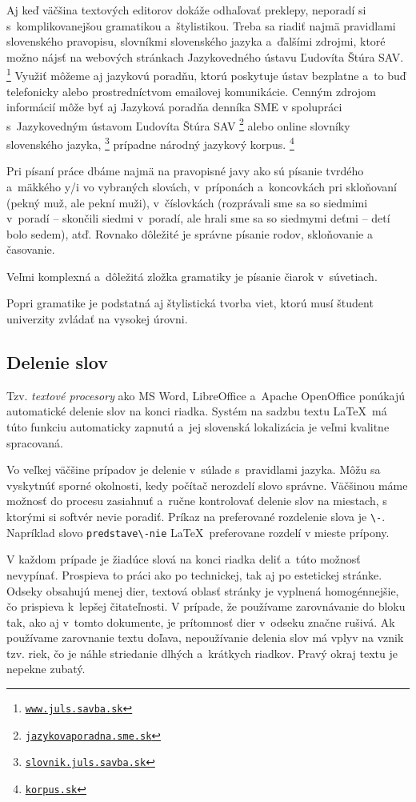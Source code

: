 Aj keď väčšina textových editorov dokáže odhaľovať preklepy,
neporadí si s~komplikovanejšou gramatikou a~štylistikou.
Treba sa riadiť najmä pravidlami slovenského pravopisu,
slovníkmi slovenského jazyka a~ďalšími zdrojmi,
ktoré možno nájsť na webových stránkach
Jazykovedného ústavu Ľudovíta Štúra SAV.%
\footnote{\href{https://www.juls.savba.sk/}{\tt www.juls.savba.sk}}
Využiť môžeme aj jazykovú poradňu,
ktorú poskytuje ústav bezplatne a~to buď telefonicky alebo
prostredníctvom emailovej komunikácie.
Cenným zdrojom informácií môže byť aj Jazyková poradňa
denníka SME v spolupráci
s~Jazykovedným ústavom Ľudovíta Štúra SAV%
\footnote{\href{https://jazykovaporadna.sme.sk/}{\tt jazykovaporadna.sme.sk}}
alebo online slovníky slovenského jazyka,%
\footnote{\href{https://slovnik.juls.savba.sk/}{\tt slovnik.juls.savba.sk}}
prípadne národný jazykový korpus.%
\footnote{\href{https://korpus.sk/}{\tt korpus.sk}}

Pri písaní práce dbáme najmä na pravopisné javy ako sú písanie
tvrdého a~mäkkého y/i vo vybraných slovách,
v~príponách a~koncovkách pri skloňovaní
(pekný muž, ale pekní muži),
v~číslovkách (rozprávali sme sa so siedmimi v~poradí
-- skončili siedmi v~poradí,
ale hrali sme sa so siedmymi deťmi -- detí bolo sedem), atď.
Rovnako dôležité je správne písanie rodov,
skloňovanie a časovanie.

Veľmi komplexná a~dôležitá zložka gramatiky
je písanie čiarok v~súvetiach.

Popri gramatike je podstatná aj štylistická tvorba viet,
ktorú musí študent univerzity zvládať na vysokej úrovni.

\subsection{Delenie slov}
Tzv. \emph{textové procesory} ako MS Word, LibreOffice a~Apache OpenOffice
ponúkajú automatické delenie slov na konci riadka.
Systém na sadzbu textu \LaTeX\ má túto funkciu automaticky zapnutú a~jej slovenská lokalizácia je veľmi kvalitne spracovaná.

Vo veľkej väčšine prípadov je delenie
v~súlade s~pravidlami jazyka.
Môžu sa vyskytnúť sporné okolnosti,
kedy počítač nerozdelí slovo správne.
Väčšinou máme možnosť do procesu zasiahnuť
a~ručne kontrolovať delenie slov na miestach,
s ktorými si softvér nevie poradiť.
Príkaz na preferované rozdelenie slova je \verb|\-|.
Napríklad slovo \verb|predstave\-nie| \LaTeX\
preferovane rozdelí v mieste prípony.

V každom prípade je žiadúce slová na konci riadka deliť
a\ túto možnosť nevypínať.
Prospieva to práci ako po technickej,
tak aj po estetickej stránke.
Odseky obsahujú menej dier,
textová oblasť stránky je vyplnená homogénnejšie,
čo prispieva k~lepšej čitateľnosti.
V prípade, že používame zarovnávanie do bloku tak,
ako aj v~tomto dokumente,
je prítomnosť dier v~odseku značne rušivá.
Ak používame zarovnanie textu doľava,
nepoužívanie delenia slov má vplyv na vznik tzv. riek,
čo je náhle striedanie dlhých a~krátkych riadkov.
Pravý okraj textu je nepekne zubatý.

